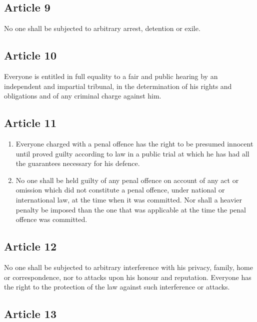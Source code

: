 \documentclass[
  ngerman,
  american,
  titlepage,
  openright,
  DIV=calc,
  toc=listof,
  listof=nochaptergap]{scrbook}
\begin{document}
\subsection{Article 9}\label{article-9-3}

No one shall be subjected to arbitrary arrest, detention or exile.

\subsection{Article 10}\label{article-10-3}

Everyone is entitled in full equality to a fair and public hearing by an
independent and impartial tribunal, in the determination of his rights
and obligations and of any criminal charge against him.

\subsection{Article 11}\label{article-11-3}

\begin{enumerate}
\def\labelenumi{\arabic{enumi}.}
\item
  Everyone charged with a penal offence has the right to be presumed
  innocent until proved guilty according to law in a public trial at
  which he has had all the guarantees necessary for his defence.
\item
  No one shall be held guilty of any penal offence on account of any act
  or omission which did not constitute a penal offence, under national
  or international law, at the time when it was committed. Nor shall a
  heavier penalty be imposed than the one that was applicable at the
  time the penal offence was committed.
\end{enumerate}

\subsection{Article 12}\label{article-12-3}

No one shall be subjected to arbitrary interference with his privacy,
family, home or correspondence, nor to attacks upon his honour and
reputation. Everyone has the right to the protection of the law against
such interference or attacks.

\subsection{Article 13}\label{article-13-3}
\end{document}
